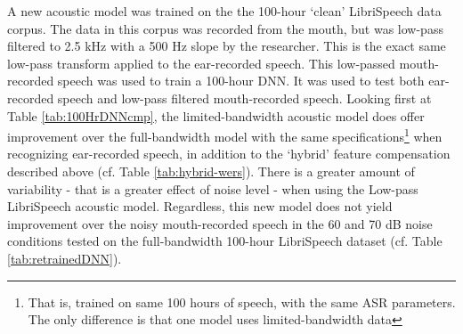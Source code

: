 % 


A new acoustic model was trained on the the 100-hour `clean' LibriSpeech data corpus.  The data in this corpus was recorded from the mouth, but was low-pass filtered to 2.5 kHz with a 500 Hz slope by the researcher.  This is the exact same low-pass transform applied to the ear-recorded speech.  This low-passed mouth-recorded speech was used to train a 100-hour DNN. It was used to test both ear-recorded speech and low-pass filtered mouth-recorded speech.  Looking first at Table \ref{tab:100HrDNNcmp}, the limited-bandwidth acoustic model does offer improvement over the full-bandwidth model with the same specifications\footnote{That is, trained on same 100 hours of speech, with the same ASR parameters. The only difference is that one model uses limited-bandwidth data} when recognizing ear-recorded speech, in addition to the `hybrid' feature compensation described above (cf. Table \ref{tab:hybrid-wers}).  There is a greater amount of variability - that is a greater effect of noise level - when using the Low-pass LibriSpeech acoustic model.  Regardless, this new model does not yield improvement over the noisy mouth-recorded speech in the 60 and 70 dB noise conditions tested on the full-bandwidth 100-hour LibriSpeech dataset (cf. Table \ref{tab:retrainedDNN}).

